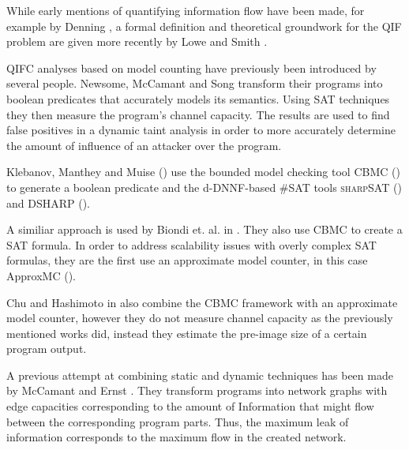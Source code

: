 While early mentions of quantifying information flow have been made, for example by Denning \cite{denning82}, a formal definition and theoretical groundwork for the QIF problem are given more recently by Lowe \cite{lowe02} and Smith \cite{smith09}.

QIFC analyses based on model counting have previously been introduced by several people.
Newsome, McCamant and Song \cite{newsome09} transform their programs into boolean predicates that accurately models its semantics. Using SAT techniques they then measure the program's channel capacity. The results are used to find false positives in a dynamic taint analysis in order to more accurately determine the amount of influence of an attacker over the program.

Klebanov, Manthey and Muise (\cite{klebanov13}) use the bounded model checking tool CBMC (\cite{cbmc}) to generate a boolean predicate and the d-DNNF-based \#SAT tools \textsc{sharp}SAT (\cite{thurley06}) and \textsc{DSHARP} (\cite{muise12}).

A similiar approach is used by Biondi et. al. in \cite{biondi18}. They also use CBMC to create a SAT formula. In order to address scalability issues with overly complex SAT formulas, they are the first use an approximate model counter, in this case ApproxMC (\cite{chakraborty13}).

Chu and Hashimoto in \cite{chu19} also combine the CBMC framework with an approximate model counter, however they do not measure channel capacity as the previously mentioned works did, instead they estimate the pre-image size of a certain program output.

A previous attempt at combining static and dynamic techniques has been made by McCamant and Ernst \cite{mccamant08}. They transform programs into network graphs with edge capacities corresponding to the amount of Information that might flow between the corresponding program parts. Thus, the maximum leak of information corresponds to the maximum flow in the created network. 

